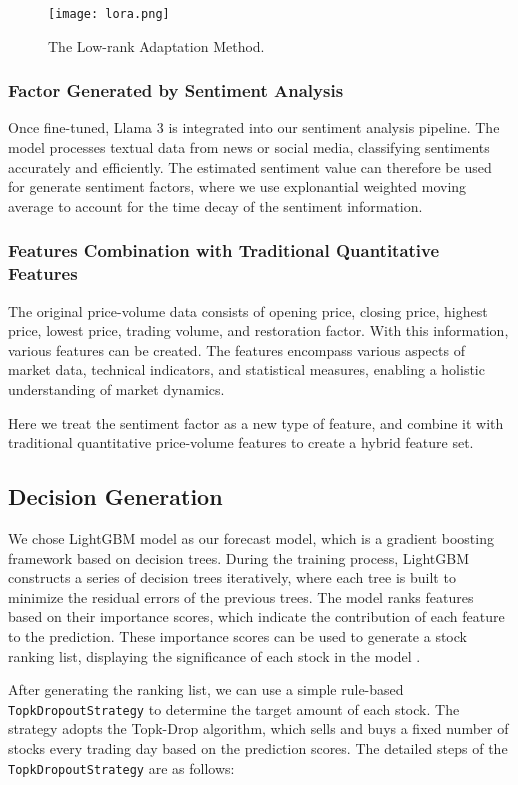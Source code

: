 \documentclass[conference]{IEEEtran}
\begin{document}
\begin{figure}[htbp]
    \centering
    \texttt{[image: lora.png]}
    \caption{The Low-rank Adaptation Method.}
    \label{fig:lora}
\end{figure}

\subsubsection{\textbf{Factor Generated by Sentiment Analysis}}
Once fine-tuned, Llama 3 is integrated into our sentiment analysis pipeline. 
The model processes textual data from news or social media, classifying sentiments accurately and efficiently. 
The estimated sentiment value can therefore be used for generate sentiment factors, where we use explonantial weighted moving average to account for the time decay of the sentiment information.

\subsubsection{\textbf{Features Combination with Traditional Quantitative Features}}
The original price-volume data consists of opening price, closing price, highest price, lowest price, trading volume, and restoration factor. 
With this information, various features can be created.
The features encompass various aspects of market data, technical indicators, and statistical measures, enabling a holistic understanding of market dynamics.

Here we treat the sentiment factor as a new type of feature, and combine it with traditional quantitative price-volume features to create a hybrid feature set.

\subsection{\textbf{Decision Generation}}

We chose LightGBM model as our forecast model, which is a gradient boosting framework based on decision trees. 
During the training process, LightGBM constructs a series of decision trees iteratively, where each tree is built to minimize the residual errors of the previous trees. 
The model ranks features based on their importance scores, which indicate the contribution of each feature to the prediction. 
These importance scores can be used to generate a stock ranking list, displaying the significance of each stock in the model \cite{ke2017}.

After generating the ranking list, we can use a simple rule-based \texttt{TopkDropoutStrategy} to determine the target amount of each stock. 
The strategy adopts the Topk-Drop algorithm, which sells and buys a fixed number of stocks every trading day based on the prediction scores. 
The detailed steps of the \texttt{TopkDropoutStrategy} are as follows:
\end{document}
